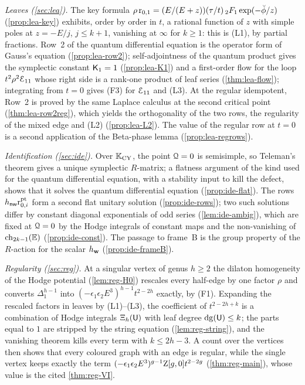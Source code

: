 \emph{Leaves (\cref{sec:lea}).} The key formula $\rho\,\mathrm{r}_{0,1}=(E/(E+z))(\tau/t)\,{}_2F_1\exp(-\breve{\phi}/z)$ (\cref{prop:lea-key}) exhibits, order by order in $t$, a rational function of $z$ with simple poles at $z=-E/j$, $j\leq k+1$, vanishing at $\infty$ for $k\geq1$: this is (L1), by partial fractions. Row~2 of the quantum differential equation is the operator form of Gauss's equation (\cref{prop:lea-row2}); self-adjointness of the quantum product gives the symplectic constant $\mathsf{K}_{1}=1$ (\cref{prop:lea-K1}) and a first-order flow for the loop $t^2\rho^2\mathcal{E}_{11}$ whose right side is a rank-one product of leaf series (\cref{thm:lea-flow}); integrating from $t=0$ gives (F3) for $\mathcal{E}_{11}$ and (L3). At the regular idempotent, Row~2 is proved by the same Laplace calculus at the second critical point (\cref{thm:lea-row2reg}), which yields the orthogonality of the two rows, the regularity of the mixed edge and (L2) (\cref{prop:lea-L2}). The value of the regular row at $t=0$ is a second application of the Beta-phase lemma (\cref{prop:lea-regrows}).

\emph{Identification (\cref{sec:ide}).} Over $\mathbb{K}_{\mathrm{CY}}$, the point $\mathcal{Q}=0$ is semisimple, so Teleman's theorem gives a unique symplectic $R$-matrix; a flatness argument of the kind used for the quantum differential equation, with a stability input to kill the defect, shows that it solves the quantum differential equation (\cref{prop:ide-flat}). The rows $h_{\mathsf{nw}}\mathrm{r}^{\mathrm{pt}}_{0,i}$ form a second flat unitary solution (\cref{prop:ide-rows}); two such solutions differ by constant diagonal exponentials of odd series (\cref{lem:ide-ambig}), which are fixed at $\mathcal{Q}=0$ by the Hodge integrals of constant maps and the non-vanishing of $\mathrm{ch}_{2k-1}(\mathbb{E})$ (\cref{prop:ide-const}). The passage to frame~B is the group property of the $R$-action for the scalar $h_{\mathbf{w}}$ (\cref{prop:ide-frameB}).

\emph{Regularity (\cref{sec:reg}).} At a singular vertex of genus $h\geq2$ the dilaton homogeneity of the Hodge potential (\cref{lem:reg-H0}) rescales every half-edge by one factor $\rho$ and converts $\Delta_1^{h-1}$ into $(-\epsilon_1\epsilon_2E^3)^{h-1}t^{2-2h}$ exactly, by (F1). Expanding the rescaled factors in leaves by (L1)--(L3), the coefficient of $t^{2-2h+k}$ is a combination of Hodge integrals $\Xi_h(\mathsf{U})$ with leaf degree $\mathrm{dg}(\mathsf{U})\leq k$; the parts equal to $1$ are stripped by the string equation (\cref{lem:reg-string}), and the vanishing theorem kills every term with $k\leq2h-3$. A count over the vertices then shows that every coloured graph with an edge is regular, while the single vertex keeps exactly the term $(-\epsilon_1\epsilon_2E^3)^{g-1}\mathrm{Z}[g,0]t^{2-2g}$ (\cref{thm:reg-main}), whose value is the cited \cref{thm:reg-VI}.

